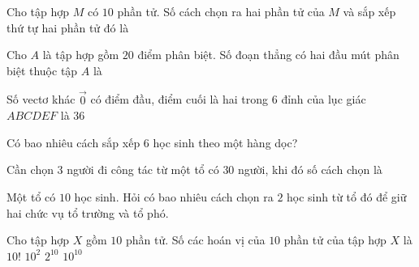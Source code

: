 \begin{ex}%
Cho tập hợp $M$ có $10$ phần tử. Số cách chọn ra hai phần tử của $M$ và sắp xếp thứ tự hai phần tử đó là
\end{ex}
\begin{ex}%
    Cho $A$ là tập hợp gồm $20$ điểm phân biệt. Số đoạn thẳng có hai đầu mút phân biệt thuộc tập $A$ là
\end{ex}
\begin{ex}%
    Số vectơ khác $\overrightarrow{0}$ có điểm đầu, điểm cuối là hai trong 6 đỉnh của lục giác $ABCDEF$ là
    {$36$}
\end{ex}
\begin{ex}%
    Có bao nhiêu cách sắp xếp $6$ học sinh theo một hàng dọc?
\end{ex}
\begin{ex}%
    Cần chọn $3$ người đi công tác từ một tổ có $30$ người, khi đó số cách chọn là
\end{ex}
\begin{ex}%
    Một tổ có $10$ học sinh. Hỏi có bao nhiêu cách chọn ra $2$ học sinh từ tổ đó để giữ hai chức vụ tổ trường và tổ phó.
\end{ex}

\begin{ex}%
Cho tập hợp $X$ gồm $10$ phần tử. Số các hoán vị của $10$ phần tử của tập hợp $X$ là
\choice
{\True $10!$}
{$10^{2}$}
{$2^{10}$}
{$10^{10}$}
\end{ex}

